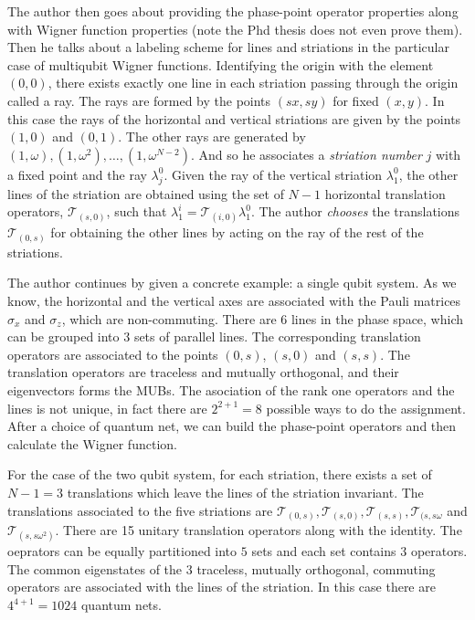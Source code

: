 \documentclass[a4paper]{article}
\begin{document}
  The author then goes about providing the phase-point
  operator properties along with Wigner function properties
  (note the Phd thesis does not even prove them). Then he
  talks about a labeling scheme for lines and striations in
  the particular case of multiqubit Wigner functions.
  Identifying the origin with the element $(0,0)$, there
  exists exactly one line in each striation passing through
  the origin called a ray. The rays are formed by the points
  $(sx,sy)$ for fixed $(x,y)$. In this case the rays of the
  horizontal and vertical striations are given by the points
  $(1,0)$ and $(0,1)$. The other rays are generated by
  $(1,\omega), (1,\omega^2), \ldots,(1,\omega^{N-2})$. And
  so he associates a \textit{striation number} $j$ with a
  fixed point and the ray $\lambda_j^0$. Given the ray of
  the vertical striation $\lambda_1^0$, the other lines of
  the striation are obtained using the set of $N-1$ 
  horizontal translation operators, $\mathcal T_{(s,0)}$,
  such that $\lambda_1^i = \mathcal T_{(i,0)}\lambda_1^0$.
  The author \textit{chooses} the translations $\mathcal
  T_{(0,s)}$ for obtaining the other lines by acting on the
  ray of the rest of the striations.

  The author continues by given a concrete example: a single
  qubit system. As we know, the horizontal and the vertical
  axes are associated with the Pauli matrices $\sigma_x$ and
  $\sigma_z$, which are non-commuting. There are $6$ lines
  in the phase space, which can be grouped into 3 sets of
  parallel lines. The corresponding translation operators
  are associated to the points $(0,s)$, $(s,0)$ and $(s,s)$.
  The translation operators are traceless and mutually
  orthogonal, and their eigenvectors forms the MUBs. The
  asociation of the rank one operators and the lines is not
  unique, in fact there are $2^{2+1} = 8$ possible ways to
  do the assignment. After a choice of quantum net, we can
  build the phase-point operators and then calculate the
  Wigner function.

  For the case of the two qubit system, for each striation,
  there exists a set of $N-1 = 3$ translations which leave
  the lines of the striation invariant. The translations
  associated to the five striations are $\mathcal T_{(0,s)},
  \mathcal T_{(s,0)}, \mathcal T_{(s,s)}, \mathcal
  T_{(s,s\omega}$ and $\mathcal T_{(s,s\omega^2)}$. There
  are 15 unitary translation operators along with the
  identity. The oeprators can be equally partitioned into
  $5$ sets and each set contains $3$ operators. The common
  eigenstates of the $3$ traceless, mutually orthogonal,
  commuting operators are associated with the lines of the
  striation. In this case there are $4^{4+1} = 1024$ quantum
  nets.
\end{document}
